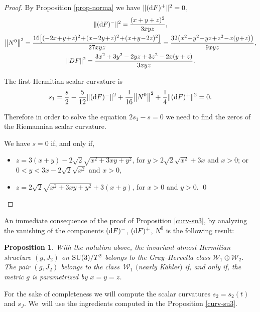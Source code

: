 \documentclass[10pt,a4paper]{amsart}
\numberwithin{equation}{section}
\newtheorem{Proposition}[Theorem]{Proposition}
 { \theoremstyle{definition}
\newtheorem{Definition}[Theorem]{Definition}
\newtheorem{Question}[Theorem]{Question}
\newtheorem*{Notation}{Notation}
\newtheorem{Example}[Theorem]{Example}
\newtheorem{Remark}[Theorem]{Remark} }
\begin{document}
\begin{proof}
By Proposition \ref{prop-norma} we have $\|({\rm d}F)^{+}\|^{2}=0$,
\begin{gather*}
\|({\rm d}F)^{-}\|^{2}=\dfrac{(x+y+z)^{2}}{3xyz},
\\
\big\|N^{0}\big\|^{2}=\dfrac{16\big[(-2x\!+\!y\!+\!z)^{2}\!+\!(x\!-\!2y\!+\!z)^{2}\!+\!(x\!+\!y\!-\!2z)^{2}\big]}{27 xyz}
=\dfrac{32 \big(x^2 \!+\! y^2 \!-\! y z \!+\! z^2 \!-\! x (y \!+\! z)\big)}{9 x y z},
\\
\|DF\|^{2}=\dfrac{3 x^2 + 3 y^2 - 2 y z + 3 z^2 - 2 x (y + z)}{3 x y z}.
\end{gather*}

The first Hermitian scalar curvature is
\begin{gather*}
s_{1}=\dfrac{s}{2}-\dfrac{5}{12}\|({\rm d}F)^{-}\|^{2}+\dfrac{1}{16}\big\|N^{0}\big\|^{2}+\dfrac{1}{4}\|({\rm d}F)^{+}\|^{2}=0.
\end{gather*}

Therefore in order to solve the equation $2s_{1}-s=0$ we need to find the zeros of the Riemannian scalar curvature.

We have $s=0$ if, and only if,
\begin{itemize}\itemsep=0pt
\item[$(i)$] $z=3 (x+y)-2 \sqrt{2} \sqrt{x^2+3 x y+y^2}$, for $y>2 \sqrt{2} \sqrt{x^2}+3 x$ and $x>0$; or
$0<y<3 x-2 \sqrt{2} \sqrt{x^2}$ and $x>0$,
\item[$(ii)$] $z=2 \sqrt{2} \sqrt{x^2+3 x y+y^2}+3 (x+y)$, for $x>0$ and $y>0$.
\hfill \qed
\end{itemize}\renewcommand{\qed}{}
\end{proof}

An immediate consequence of the proof of Proposition \ref{curv-su3}, by analyzing the vanishing of the components $({\rm d}F)^{-}$, $({\rm d}F)^{+}$, $N^0$ is the following result:
\begin{Proposition}\label{prop-c1}
With the notation above, the invariant almost Hermitian structure $(g, J_{2})$ on ${\rm SU}(3)/T^2$ belongs to the Gray--Hervella class $\mathcal{W}_{1}\oplus \mathcal{W}_{2}$. The pair $(g, J_{2})$ belongs to the class~$\mathcal{W}_{1}$ $($nearly K\"ahler$)$ if, and only if, the metric $g$ is parametrized by $x=y=z$.
\end{Proposition}

For the sake of completeness we will compute the scalar curvatures $s_2=s_{2}(t)$ and $s_J$. We~will use the ingredients computed in the Proposition \ref{curv-su3}.
\end{document}
